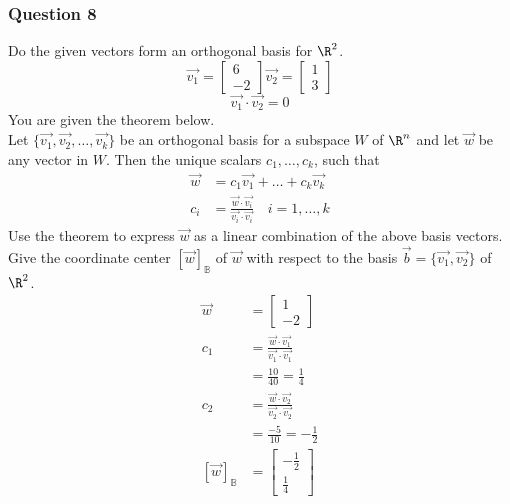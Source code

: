 \documentclass{math}
\begin{document}
\subsubsection*{Question 8}
Do the given vectors form an orthogonal basis for \( \R^2 \).
\[ \vec{v_1} = \begin{bmatrix}6 \\ -2\end{bmatrix}
  \vec{v_2} = \begin{bmatrix}1 \\ 3\end{bmatrix} \]
\[ \vec{v_1}\cdot\vec{v_2} = 0 \]
You are given the theorem below. \\
Let \( \{\vec{v_1},\vec{v_2},\dots,\vec{v_k}\} \) be an orthogonal basis for a
subspace \( W \) of \( \R^n \) and let \( \vec{w} \) be any vector in \( W \).
Then the unique scalars \( c_1,\dots,c_k \), such that
\begin{align*}
  \vec{w} &= c_1\vec{v_1}+\dots+c_k\vec{v_k} \\
  c_i &= \frac{\vec{w}\cdot\vec{v_i}}{\vec{v_i}\cdot\vec{v_i}} \quad
    i = 1,\dots,k
\end{align*}
Use the theorem to express \( \vec{w} \) as a linear combination of the above
basis vectors. Give the coordinate center \( [\vec{w}]_{\mathbb{B}} \) of
\( \vec{w} \) with respect to the basis \( \vec{b} = \{\vec{v_1},\vec{v_2}\} \)
of \( \R^2 \).
\begin{align*}
  \vec{w} &= \begin{bmatrix}1 \\ -2\end{bmatrix} \\
  c_1 &= \frac{\vec{w}\cdot\vec{v_1}}{\vec{v_1}\cdot\vec{v_1}} \\
  &= \frac{10}{40} = \frac{1}{4} \\
  c_2 &= \frac{\vec{w}\cdot\vec{v_2}}{\vec{v_2}\cdot\vec{v_2}} \\
  &= \frac{-5}{10} = -\frac{1}{2} \\
  [\vec{w}]_{\mathbb{B}} &=
    \begin{bmatrix}-\frac{1}{2} \\ \frac{1}{4}\end{bmatrix}
\end{align*}
\end{document}

